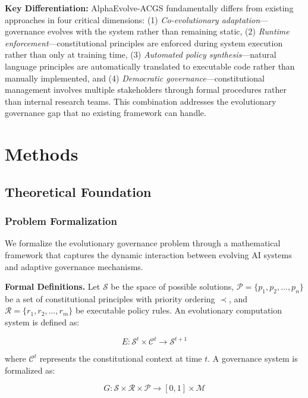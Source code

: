 \documentclass[sigconf,natbib]{acmart}
\begin{document}
\textbf{Key Differentiation:} AlphaEvolve-ACGS fundamentally differs from existing approaches in four critical dimensions: (1) \textit{Co-evolutionary adaptation}—governance evolves with the system rather than remaining static, (2) \textit{Runtime enforcement}—constitutional principles are enforced during system execution rather than only at training time, (3) \textit{Automated policy synthesis}—natural language principles are automatically translated to executable code rather than manually implemented, and (4) \textit{Democratic governance}—constitutional management involves multiple stakeholders through formal procedures rather than internal research teams. This combination addresses the evolutionary governance gap that no existing framework can handle.



\section{Methods}
\label{sec:methods}

\subsection{Theoretical Foundation}
\label{subsec:theoretical_foundation}

\subsubsection{Problem Formalization}
\label{subsubsec:problem_formalization}

We formalize the evolutionary governance problem through a mathematical framework that captures the dynamic interaction between evolving AI systems and adaptive governance mechanisms.

\textbf{Formal Definitions.} Let $\mathcal{S}$ be the space of possible solutions, $\mathcal{P} = \{p_1, p_2, \ldots, p_n\}$ be a set of constitutional principles with priority ordering $\prec$, and $\mathcal{R} = \{r_1, r_2, \ldots, r_m\}$ be executable policy rules. An evolutionary computation system is defined as:

$$E: \mathcal{S}^t \times \mathcal{C}^t \rightarrow \mathcal{S}^{t+1}$$

where $\mathcal{C}^t$ represents the constitutional context at time $t$. A governance system is formalized as:

$$G: \mathcal{S} \times \mathcal{R} \times \mathcal{P} \rightarrow [0,1] \times \mathcal{M}$$
\end{document}
